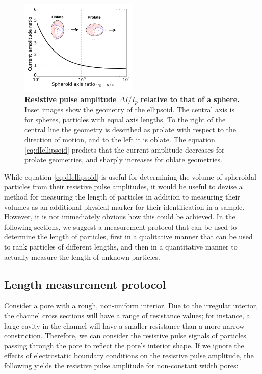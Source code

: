 		\begin{figure}
			\includegraphics[width=0.5\textwidth]{dIellipsoid}
			\caption{\textbf{Resistive pulse amplitude $\Delta I/I_{p}$ relative to that of a sphere.} Inset images show the geometry of the ellipsoid. The central axis is for spheres, particles with equal axis lengths. To the right of the central line the geometry is described as prolate with respect to the direction of motion, and to the left it is oblate. The equation \ref{eq:dIellipsoid} predicts that the current amplitude decreases for prolate geometries, and sharply increases for oblate geometries.}
			\label{fig:dIellipsoid}
		\end{figure}


		
		While equation \ref{eq:dIellipsoid} is useful for determining the volume of spheroidal particles from their resistive pulse amplitudes, it would be useful to devise a method for measuring the length of particles in addition to measuring their volumes as an additional physical marker for their identification in a sample. However, it is not immediately obvious how this could be achieved. In the following sections, we suggest a measurement protocol that can be used to determine the length of particles, first in a qualitative manner that can be used to rank particles of different lengths, and then in a quantitative manner to actually measure the length of unknown particles.
		
		
		\subsection{Length measurement protocol}
		
			Consider a pore with a rough, non-uniform interior. Due to the irregular interior, the channel cross sections will have a range of resistance values; for instance, a large cavity in the channel will have a smaller resistance than a more narrow constriction. Therefore, we can consider the resistive pulse signals of particles passing through the pore to reflect the pore's interior shape. If we ignore the effects of electrostatic boundary conditions on the resistive pulse amplitude, the following yields the resistive pulse amplitude for non-constant width pores:
			
